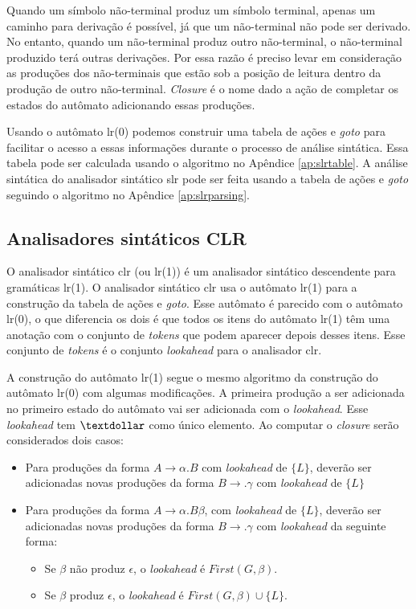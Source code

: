 Quando um símbolo não-terminal produz um símbolo terminal, apenas um caminho para derivação é possível, já que um não-terminal não pode ser derivado. No entanto, quando um não-terminal produz outro não-terminal, o não-terminal produzido terá outras derivações. Por essa razão é preciso levar em consideração as produções dos não-terminais que estão sob a posição de leitura dentro da produção de outro não-terminal. \textit{Closure} é o nome dado a ação de completar os estados do autômato adicionando essas produções.


Usando o autômato \gls{lr}(0) podemos construir uma tabela de ações e \textit{goto} para facilitar o acesso a essas informações durante o processo de análise sintática. Essa tabela pode ser calculada usando o algoritmo no Apêndice \ref{ap:slrtable}. A análise sintática do analisador sintático \gls{slr} pode ser feita usando a tabela de ações e \textit{goto} seguindo o algoritmo no Apêndice \ref{ap:slrparsing}.


\subsection{Analisadores sintáticos CLR}
O analisador sintático \gls{clr} (ou \gls{lr}(1)) é um analisador sintático descendente para gramáticas \gls{lr}(1). O analisador sintático \gls{clr} usa o autômato \gls{lr}(1) para a construção da tabela de ações e \textit{goto}. Esse autômato é parecido com o autômato \gls{lr}(0), o que diferencia os dois é que todos os itens do autômato \gls{lr}(1) têm uma anotação com o conjunto de \textit{tokens} que podem aparecer depois desses itens. Esse conjunto de \textit{tokens} é o conjunto \textit{lookahead} para o analisador \gls{clr}.

A construção do autômato \gls{lr}(1) segue o mesmo algoritmo da construção do autômato \gls{lr}(0) com algumas modificações. A primeira produção a ser adicionada no primeiro estado do autômato vai ser adicionada com o \textit{lookahead}. Esse \textit{lookahead} tem $\textdollar$ como único elemento. Ao computar o \textit{closure} serão considerados dois casos:
\begin{itemize}[label=$\sbullet$]
  \item Para produções da forma $A \rightarrow \alpha . B$ com \textit{lookahead} de $\{L\}$, deverão ser adicionadas novas produções da forma $B \rightarrow . \gamma$ com \textit{lookahead} de $\{L\}$
  \item Para produções da forma $A \rightarrow \alpha.B\beta$, com \textit{lookahead} de $\{L\}$, deverão ser adicionadas novas produções da forma $B \rightarrow . \gamma$ com \textit{lookahead} da seguinte forma:
        \begin{itemize}
          \item Se $\beta$ não produz $\epsilon$, o \textit{lookahead} é $First(G,\beta)$.
          \item Se $\beta$ produz $\epsilon$, o \textit{lookahead} é $First(G,\beta)\cup\{L\}$.
        \end{itemize}
\end{itemize}


